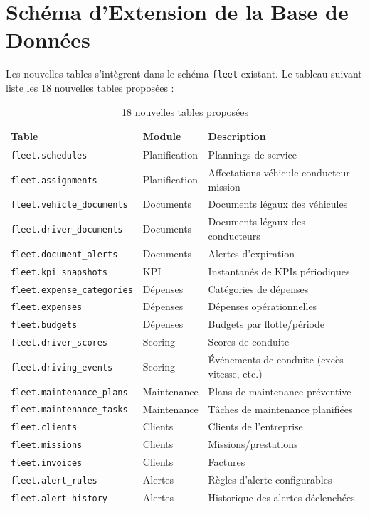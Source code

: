 \documentclass[12pt,a4paper]{report}
\begin{document}
\section{Schéma d'Extension de la Base de Données}

Les nouvelles tables s'intègrent dans le schéma \texttt{fleet} existant. Le tableau suivant liste les 18 nouvelles tables proposées :

\begin{longtable}{p{5cm}p{2.5cm}p{5.5cm}}
\toprule
\textbf{Table} & \textbf{Module} & \textbf{Description} \\
\midrule
\endhead
\texttt{fleet.schedules} & Planification & Plannings de service \\
\texttt{fleet.assignments} & Planification & Affectations véhicule-conducteur-mission \\
\texttt{fleet.vehicle\_documents} & Documents & Documents légaux des véhicules \\
\texttt{fleet.driver\_documents} & Documents & Documents légaux des conducteurs \\
\texttt{fleet.document\_alerts} & Documents & Alertes d'expiration \\
\texttt{fleet.kpi\_snapshots} & KPI & Instantanés de KPIs périodiques \\
\texttt{fleet.expense\_categories} & Dépenses & Catégories de dépenses \\
\texttt{fleet.expenses} & Dépenses & Dépenses opérationnelles \\
\texttt{fleet.budgets} & Dépenses & Budgets par flotte/période \\
\texttt{fleet.driver\_scores} & Scoring & Scores de conduite \\
\texttt{fleet.driving\_events} & Scoring & Événements de conduite (excès vitesse, etc.) \\
\texttt{fleet.maintenance\_plans} & Maintenance & Plans de maintenance préventive \\
\texttt{fleet.maintenance\_tasks} & Maintenance & Tâches de maintenance planifiées \\
\texttt{fleet.clients} & Clients & Clients de l'entreprise \\
\texttt{fleet.missions} & Clients & Missions/prestations \\
\texttt{fleet.invoices} & Clients & Factures \\
\texttt{fleet.alert\_rules} & Alertes & Règles d'alerte configurables \\
\texttt{fleet.alert\_history} & Alertes & Historique des alertes déclenchées \\
\bottomrule
\caption{18 nouvelles tables proposées}
\end{longtable}
\end{document}
